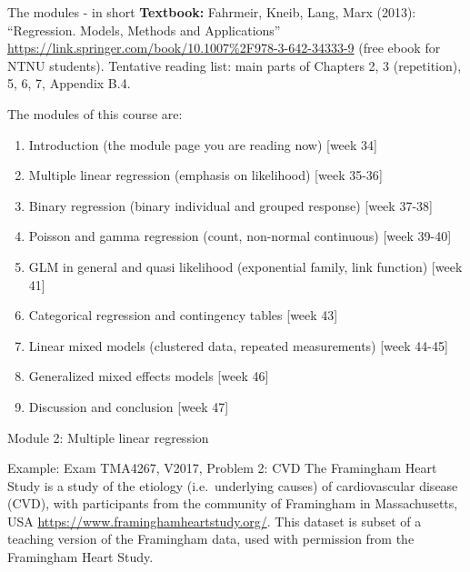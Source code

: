 \documentclass[
  ignorenonframetext,
]{beamer}
\begin{document}
\begin{frame}
\begin{block}{The modules - in short}
\protect\hypertarget{the-modules---in-short}{}
\textbf{Textbook:} Fahrmeir, Kneib, Lang, Marx (2013): ``Regression.
Models, Methods and Applications''
\url{https://link.springer.com/book/10.1007\%2F978-3-642-34333-9} (free
ebook for NTNU students). Tentative reading list: main parts of Chapters
2, 3 (repetition), 5, 6, 7, Appendix B.4.
\end{block}
\end{frame}

\begin{frame}
The modules of this course are:

\begin{enumerate}
\item
  Introduction (the module page you are reading now) {[}week 34{]}
\item
  Multiple linear regression (emphasis on likelihood) {[}week 35-36{]}
\item
  Binary regression (binary individual and grouped response) {[}week
  37-38{]}
\item
  Poisson and gamma regression (count, non-normal continuous) {[}week
  39-40{]}
\item
  GLM in general and quasi likelihood (exponential family, link
  function) {[}week 41{]}
\item
  Categorical regression and contingency tables {[}week 43{]}
\item
  Linear mixed models (clustered data, repeated measurements) {[}week
  44-45{]}
\item
  Generalized mixed effects models {[}week 46{]}
\item
  Discussion and conclusion {[}week 47{]}
\end{enumerate}
\end{frame}

\begin{frame}
\begin{block}{Module 2: Multiple linear regression}
\protect\hypertarget{module-2-multiple-linear-regression}{}
\begin{block}{Example: Exam TMA4267, V2017, Problem 2: CVD}
\protect\hypertarget{example-exam-tma4267-v2017-problem-2-cvd}{}
The Framingham Heart Study is a study of the etiology (i.e.~underlying
causes) of cardiovascular disease (CVD), with participants from the
community of Framingham in Massachusetts, USA
\url{https://www.framinghamheartstudy.org/}. This dataset is subset of a
teaching version of the Framingham data, used with permission from the
Framingham Heart Study.
\end{block}
\end{block}
\end{frame}
\end{document}
